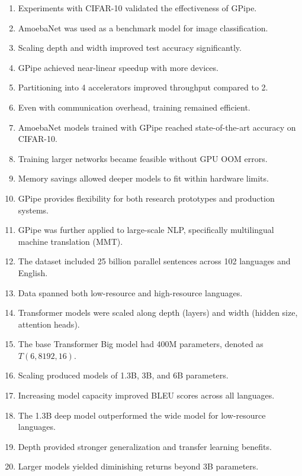 \documentclass[12pt]{article}
\begin{document}
\begin{enumerate}
\item Experiments with CIFAR-10 validated the effectiveness of GPipe.  
\item AmoebaNet was used as a benchmark model for image classification.  
\item Scaling depth and width improved test accuracy significantly.  
\item GPipe achieved near-linear speedup with more devices.  
\item Partitioning into 4 accelerators improved throughput compared to 2.  
\item Even with communication overhead, training remained efficient.  
\item AmoebaNet models trained with GPipe reached state-of-the-art accuracy on CIFAR-10.  
\item Training larger networks became feasible without GPU OOM errors.  
\item Memory savings allowed deeper models to fit within hardware limits.  
\item GPipe provides flexibility for both research prototypes and production systems.  

\item GPipe was further applied to large-scale NLP, specifically multilingual machine translation (MMT).  
\item The dataset included 25 billion parallel sentences across 102 languages and English.  
\item Data spanned both low-resource and high-resource languages.  
\item Transformer models were scaled along depth (layers) and width (hidden size, attention heads).  
\item The base Transformer Big model had 400M parameters, denoted as $T(6,8192,16)$.  
\item Scaling produced models of 1.3B, 3B, and 6B parameters.  
\item Increasing model capacity improved BLEU scores across all languages.  
\item The 1.3B deep model outperformed the wide model for low-resource languages.  
\item Depth provided stronger generalization and transfer learning benefits.  
\item Larger models yielded diminishing returns beyond 3B parameters.  


\end{enumerate}
\end{document}
